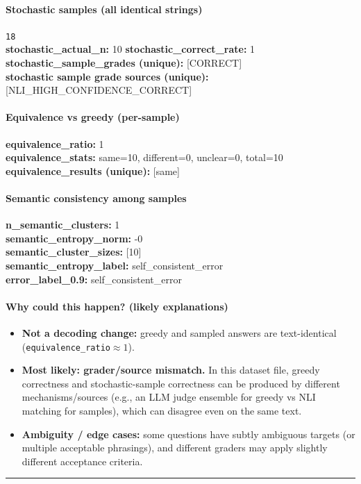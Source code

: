 \documentclass[11pt]{article}
\newcommand{\mono}[1]{\texttt{#1}}
\begin{document}
\paragraph{Stochastic samples (all identical strings)}
\mono{18}\\
\textbf{stochastic\_actual\_n:} 10 \quad \textbf{stochastic\_correct\_rate:} 1\\
\textbf{stochastic\_sample\_grades (unique):} [CORRECT]\\
\textbf{stochastic sample grade sources (unique):} [NLI\_HIGH\_CONFIDENCE\_CORRECT]\\
\paragraph{Equivalence vs greedy (per-sample)}
\textbf{equivalence\_ratio:} 1\\
\textbf{equivalence\_stats:} same=10, different=0, unclear=0, total=10\\
\textbf{equivalence\_results (unique):} [same]\\
\paragraph{Semantic consistency among samples}
\textbf{n\_semantic\_clusters:} 1\\
\textbf{semantic\_entropy\_norm:} -0\\
\textbf{semantic\_cluster\_sizes:} [10]\\
\textbf{semantic\_entropy\_label:} self\_consistent\_error\\
\textbf{error\_label\_0.9:} self\_consistent\_error\\
\paragraph{Why could this happen? (likely explanations)}
\begin{itemize}\item \textbf{Not a decoding change:} greedy and sampled answers are text-identical (\mono{equivalence\_ratio}$\approx 1$).\item \textbf{Most likely: grader/source mismatch.} In this dataset file, greedy correctness and stochastic-sample correctness can be produced by different mechanisms/sources (e.g., an LLM judge ensemble for greedy vs NLI matching for samples), which can disagree even on the same text.\item \textbf{Ambiguity / edge cases:} some questions have subtly ambiguous targets (or multiple acceptable phrasings), and different graders may apply slightly different acceptance criteria.\end{itemize}
\vspace{10pt}
\hrule
\vspace{10pt}
\end{document}

